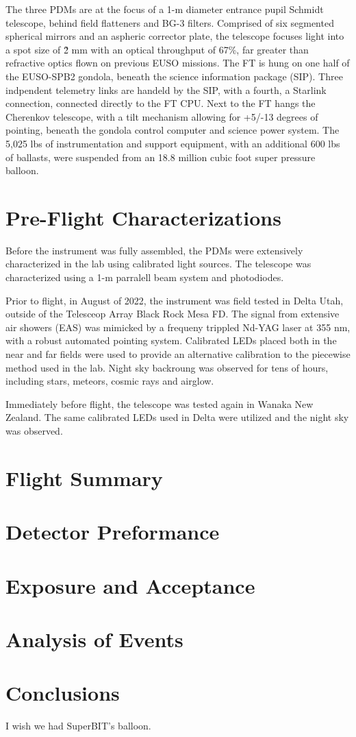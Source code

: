 \documentclass[a4paper,11pt]{article}
\begin{document}
The three PDMs are at the focus of a 1-m diameter entrance pupil Schmidt telescope, behind field flatteners and BG-3 filters. 
Comprised of six segmented spherical mirrors and an aspheric corrector plate, the telescope focuses light into a spot size of \~2 mm with an optical throughput of 67\%, far greater than refractive optics flown on previous EUSO missions. 
The FT is hung on one half of the EUSO-SPB2 gondola, beneath the science information package (SIP).
Three indpendent telemetry links are handeld by the SIP, with a fourth, a Starlink connection, connected directly to the FT CPU.  
Next to the FT hangs the Cherenkov telescope, with a tilt mechanism allowing for +5/-13 degrees of pointing, beneath the gondola control computer and science power system. 
The 5,025 lbs of instrumentation and support equipment, with an additional 600 lbs of ballasts, were suspended from an 18.8 million cubic foot super pressure balloon.


\section {Pre-Flight Characterizations}

Before the instrument was fully assembled, the PDMs were extensively characterized in the lab using calibrated light sources. 
The telescope was characterized using a 1-m parralell beam system and photodiodes. 

Prior to flight, in August of 2022, the instrument was field tested in Delta Utah, outside of the Telesceop Array Black Rock Mesa FD. 
The signal from extensive air showers (EAS) was mimicked by a frequeny trippled Nd-YAG laser at 355 nm, with a robust automated pointing system. 
Calibrated LEDs placed both in the near and far fields were used to provide an alternative calibration to the piecewise method used in the lab.
Night sky backroung was observed for tens of hours, including stars, meteors, cosmic rays and airglow. 

Immediately before flight, the telescope was tested again in Wanaka New Zealand. 
The same calibrated LEDs used in Delta were utilized and the night sky was observed.

\section{Flight Summary}

\section{Detector Preformance}

\section{Exposure and Acceptance}

\section{Analysis of Events}

\section{Conclusions}
I wish we had SuperBIT's balloon. 





\end{document}
